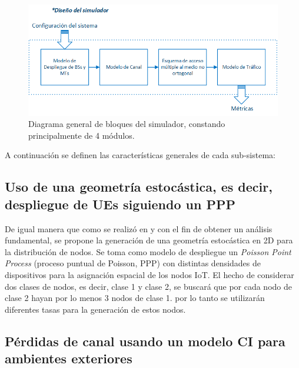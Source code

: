 \begin{figure}[th]
    \centering
    \includegraphics[scale=1]{Figures/Diagrama general de bloques del simulador}
    \decoRule
    \caption[Diagrama general de bloques del simulador, constando principalmente de 4 módulos.]{Diagrama general de bloques del simulador, constando principalmente de 4 módulos.}
    \label{fig:DiagramaGral}
\end{figure}

A continuación se definen las características generales de cada sub-sistema:\newline

\subsection{Uso de una geometría estocástica, es decir, despliegue de UEs siguiendo un PPP}

De igual manera que como se realizó en \parencite{Kouzayha2018} y \parencite{Zhang2017} con el fin de obtener un análisis fundamental, se propone la generación de una geometría estocástica en 2D para la distribución de nodos. Se toma como modelo de despliegue un \textit{Poisson Point Process }(proceso puntual de Poisson, PPP) con distintas densidades de dispositivos para la asignación espacial de los nodos IoT. El hecho de considerar dos clases de nodos, es decir, clase 1 y clase 2, se buscará que por cada nodo de clase 2 hayan por lo menos 3 nodos de clase 1. por lo tanto se utilizarán diferentes tasas para la generación de estos nodos. \newline

\subsection{Pérdidas de canal usando un modelo CI para ambientes exteriores}

